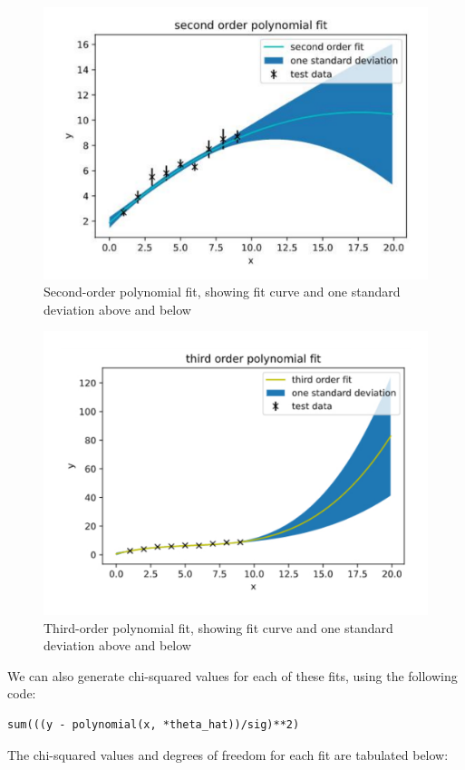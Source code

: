 \documentclass[a4paper]{article}
\begin{document}
\begin{figure}[h]
\centerline{\includegraphics[scale=0.3]{second_order.pdf}}
\caption{Second-order polynomial fit, showing fit curve and one standard deviation above and below}
\label{fig:secondorder}
\end{figure}
\newpage
\begin{figure}[h!]
\centerline{\includegraphics[scale=0.45]{third_order.pdf}}
\caption{Third-order polynomial fit, showing fit curve and one standard deviation above and below}
\label{fig:thirdorder}
\end{figure}

We can also generate chi-squared values for each of these fits, using the following code:
\begin{lstlisting}
sum(((y - polynomial(x, *theta_hat))/sig)**2)
\end{lstlisting}
The chi-squared values and degrees of freedom for each fit are tabulated below:
\end{document}
